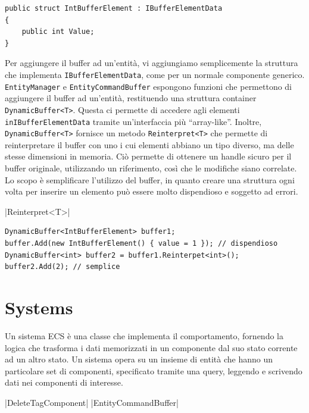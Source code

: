 \begin{lstlisting}[caption={Esempio buffer dinamico.},label={lst:dynamic-buffer},language={[Sharp]C}]
public struct IntBufferElement : IBufferElementData
{
    public int Value;
}
\end{lstlisting}

Per aggiungere il buffer ad un'entità, vi aggiungiamo semplicemente la struttura che implementa \verb|IBufferElementData|, come per un normale componente generico. \verb|EntityManager| e \verb|EntityCommandBuffer| espongono funzioni che permettono di aggiungere il buffer ad un'entità, restituendo una struttura container \verb|DynamicBuffer<T>|. Questa ci permette di accedere agli elementi \verb|inIBufferElementData| tramite un'interfaccia più ``array-like''.
Inoltre, \verb|DynamicBuffer<T>| fornisce un metodo \verb|Reinterpret<T>| che permette di reinterpretare il buffer con uno i cui elementi abbiano un tipo diverso, ma delle stesse dimensioni in memoria. Ciò permette di ottenere un handle sicuro per il buffer originale, utilizzando un riferimento, così che le modifiche siano correlate. Lo scopo è semplificare l'utilizzo del buffer, in quanto creare una struttura ogni volta per inserire un elemento può essere molto dispendioso e soggetto ad errori.

|Reinterpret<T>|

\begin{lstlisting}[caption={Esempio di utilizzo del metodo \UseVerb{ReinterpretTerm}.},label={lst:dynamic-buffer-reinterpret},language={[Sharp]C}]
DynamicBuffer<IntBufferElement> buffer1;
buffer.Add(new IntBufferElement() { value = 1 }); // dispendioso
DynamicBuffer<int> buffer2 = buffer1.Reinterpet<int>();
buffer2.Add(2); // semplice
\end{lstlisting}

\section{Systems}
Un sistema ECS è una classe che implementa il comportamento, fornendo la logica che trasforma i dati memorizzati in un componente dal suo stato corrente ad un altro stato. Un sistema opera su un insieme di entità che hanno un particolare set di componenti, specificato tramite una query, leggendo e scrivendo dati nei componenti di interesse.

|DeleteTagComponent|
|EntityCommandBuffer|

